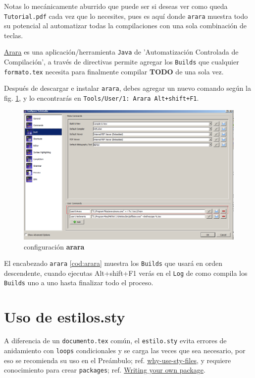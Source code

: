 Notas lo mecánicamente aburrido que puede ser si deseas ver como queda \verb|Tutorial.pdf| cada vez que lo necesites, pues es aquí donde \verb|arara| muestra todo su potencial al automatizar todas la compilaciones con una sola combinación de teclas. 

\href{https://github.com/cereda/arara}{Arara} es una aplicación/herramienta \verb|Java| de 'Automatización Controlada de Compilación', a través de directivas permite agregar los \verb|Builds| que cualquier \verb|formato.tex| necesita para finalmente compilar \textbf{TODO} de una sola vez.

Después de descargar e instalar \verb|arara|, debes agregar un nuevo comando según la fig. \ref{fig:arara1}, y lo encontrarás en \verb|Tools/User/1: Arara Alt+shift+F1|.

\begin{figure}
	\centering
	\includegraphics[width=0.7\linewidth]{Figures/arara1}
	\caption{configuración \textbf{arara}}
	\label{fig:arara1}
\end{figure} 

El encabezado \verb|arara| \ref{cod:arara} muestra los \verb|Builds| que usará en orden descendente, cuando ejecutas \textsf{Alt+shift+F1} verás en el \verb|Log| de  como compila los \verb|Builds| uno a uno hasta finalizar todo el proceso. 
	

				
\section{Uso de estilos.sty}
A diferencia de un \verb|documento.tex| común, el \verb|estilo.sty| evita errores de anidamiento con \verb|loops| condicionales y se carga las veces que sea necesario, por eso se recomienda su uso en el Preámbulo; ref. \href{http://tex.stackexchange.com/questions/91167/why-use-sty-files}{why-use-sty-files}, y requiere conocimiento para crear \verb|packages|; ref. \href{http://www.sharelatex.com/learn/Writing_your_own_package}{Writing your own package}.

